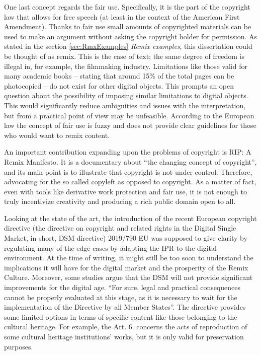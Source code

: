 One last concept regards the fair use. Specifically, it is the part of the copyright law that allows for free speech (at least in the context of the American First Amendment). Thanks to fair use small amounts of copyrighted materials can be used to make an argument without asking the copyright holder for permission. As stated in the section \ref{sec:RmxExamples} \emph{Remix examples}, this dissertation could be thought of as remix. This is the case of text; the same degree of freedom is illegal in, for example, the filmmaking industry. Limitations like those valid for many academic books – stating that around 15\% of the total pages can be photocopied – do not exist for other digital objects. This prompts an open question about the possibility of imposing similar limitations to digital objects. This would significantly reduce ambiguities and issues with the interpretation, but from a practical point of view may be unfeasible. According to the European law the concept of fair use is fuzzy and does not provide clear guidelines for those who would want to remix content.

An important contribution expanding upon the problems of copyright is RIP: A Remix Manifesto. It is a documentary about “the changing concept of copyright”, and its main point is to illustrate that copyright is not under control. Therefore, advocating for the so called copyleft as opposed to copyright. As a matter of fact, even with tools like derivative work protection and fair use, it is not enough to truly incentivize creativity and producing a rich public domain open to all.

Looking at the state of the art, the introduction of the recent European copyright directive (the directive on copyright and related rights in the Digital Single Market, in short, DSM directive) 2019/790 EU was supposed to give clarity by regulating many of the edge cases by adapting the IPR to the digital environment.
At the time of writing, it might still be too soon to understand the implications it will have for the digital market and the prosperity of the Remix Culture. Moreover, some studies argue that the DSM will not provide significant improvements for the digital age. “For sure, legal and practical consequences cannot be properly evaluated at this stage, as it is necessary to wait for the implementation of the Directive by all Member States”. The directive provides some limited options in terms of specific content like those belonging to the cultural heritage. For example, the Art. 6. concerns the acts of reproduction of some cultural heritage institutions’ works, but it is only valid for preservation purposes.

